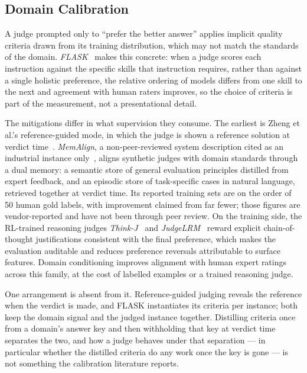 \subsection*{Domain Calibration}

A judge prompted only to ``prefer the better answer'' applies
implicit quality criteria drawn from its training distribution, which
may not match the standards of the domain.
\textit{FLASK}~\parencite{ye2024flask} makes this concrete: when a
judge scores each instruction against the specific skills that
instruction requires, rather than against a single holistic
preference, the relative ordering of models differs from one skill to
the next and agreement with human raters improves, so the choice of
criteria is part of the measurement, not a presentational detail.

The mitigations differ in what supervision they consume. The earliest
is Zheng et al.'s reference-guided mode, in which the judge is shown
a reference solution at verdict time~\parencite{zheng2023judging}.
\textit{MemAlign}, a non-peer-reviewed system description cited as an
industrial instance only~\parencite{databricks2026memalign}, aligns
synthetic judges with domain standards through a dual memory: a
semantic store of general evaluation principles distilled from expert
feedback, and an episodic store of task-specific cases in natural
language, retrieved together at verdict time. Its reported training
sets are on the order of 50 human gold labels, with improvement
claimed from far fewer; those figures are vendor-reported and have
not been through peer review. On the training side, the RL-trained
reasoning judges
\textit{Think-J}~\parencite{huang2025thinkj} and
\textit{JudgeLRM}~\parencite{chen2025judgelrm} reward explicit
chain-of-thought justifications consistent with the final preference,
which makes the evaluation auditable and reduces preference reversals
attributable to surface features. Domain conditioning improves
alignment with human expert ratings across this family, at the cost
of labelled examples or a trained reasoning judge.

One arrangement is absent from it. Reference-guided judging reveals
the reference when the verdict is made, and FLASK instantiates its
criteria per instance; both keep the domain signal and the judged
instance together. Distilling criteria once from a domain's answer
key and then withholding that key at verdict time separates the two,
and how a judge behaves under that separation --- in particular
whether the distilled criteria do any work once the key is gone --- is
not something the calibration literature reports.


